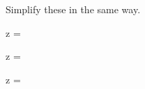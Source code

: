 Simplify these in the same way.
\begin{multicols}{2}
 \begin{ProblemSet}[pencil space=0in]


  \begin{Problem}
   \Large
   \begin{LeftEquation}
    z = 
   \end{LeftEquation}
  \end{Problem}

  \begin{Problem}
   \Large
   \begin{LeftEquation}
    z = 
   \end{LeftEquation}
  \end{Problem}

  \begin{Problem}
   \Large
   \begin{LeftEquation}
    z = 
   \end{LeftEquation}
  \end{Problem}

 \end{ProblemSet}
\end{multicols}

